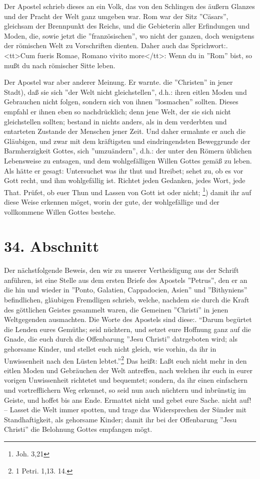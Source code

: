 \medskip

Der Apostel schrieb dieses an ein Volk, das von den Schlingen des äußern Glanzes
und der Pracht der Welt ganz umgeben war. Rom war der Sitz ''Cäsars'', gleichsam
der Brennpunkt des Reichs, und die Gebieterin aller Erfindungen und Moden, die,
sowie jetzt die ''französischen'', wo nicht der ganzen, doch wenigstens der
römischen Welt zu Vorschriften dienten. Daher auch das Sprichwort:. <tt>Cum
fueris Romae, Romano vivito more</tt>: Wenn du in ''Rom'' bist, so mußt du nach
römischer Sitte leben.

\medskip

Der Apostel war aber anderer Meinung. Er warnte. die ''Christen'' in jener
Stadt), daß sie sich ''der Welt nicht gleichstellen'', d.h.: ihren eitlen Moden
und Gebrauchen nicht folgen, sondern sich von ihnen ''losmachen'' sollten.
Dieses empfahl er ihnen eben so nachdrücklich; denn jene Welt, der sie sich
nicht gleichstellen sollten; bestand in nichts anders, als in dem verderbten und
entarteten Zustande der Menschen jener Zeit. Und daher ermahnte er auch die
Gläubigen, und zwar mit dem kräftigsten und eindringendsten Beweggrunde der
Barmherzigkeit Gottes, sich ''umzuändern'', d.h.: der unter den Römern üblichen
Lebensweise zu entsagen, und dem wohlgefälligen Willen Gottes gemäß zu leben.
Als hätte er gesagt: Untersuchet was ihr thut und Itreibet; sehet zu, ob es vor
Gott recht, und ihm wohlgefällig ist. Richtet jeden Gedanken, jedes Wort, jede
That. Prüfet, ob euer Thun und Lassen von Gott ist oder nicht; \footnote{Joh.
3,21}) damit ihr auf diese Weise erkennen möget, worin der gute, der
wohlgefällige und der vollkommene Willen Gottes bestehe.

\section{34. Abschnitt} \label{kap9_ab34}

Der nächstfolgende Beweis, den wir zu unserer Vertheidigung aus der Schrift
anführen, ist eine Stelle aus dem ersten Briefe des Apostels ''Petrus'', den er
an die hin und wieder in ''Ponto, Galatien, Cappadocien, Asien'' und
''Bithyniens'' befindlichen, gläubigen Fremdligen schrieb, welche, nachdem sie
durch die Kraft des göttlichen Geistes gesammelt waren, die Gemeinen ''Christi''
in jenen Weltgegenden ausmachten. Die Worte des Apostels sind diese:. "`Darum
begürtet die Lenden eures Gemüths; seid nüchtern, und setzet eure Hoffnung ganz
auf die Gnade, die euch durch die Offenbarung ''Jesu Christi'' datrgeboten wird;
als gehorsame Kinder, und stellet euch nicht gleich, wie vorhin, da ihr in
Unwissenheit nach den Lüsten lebtet."'\footnote{1 Petri. 1,13. 14.} Das heißt:
Laßt euch nicht mehr in den eitlen Moden und Gebräuchen der Welt antreffen, nach
welchen ihr euch in eurer vorigen Unwissenheit richtetet und bequemtet; sondern,
da ihr einen einfachern und vortrefflichern Weg erkennet, so seid nun auch
nüchtern und inbrünstig im Geiste, und hoffet bis ans Ende. Ermattet nicht und
gebet eure Sache. nicht auf! -- Lasset die Welt immer spotten, und trage das
Widersprechen der Sünder mit Standhaftigkeit, als gehorsame Kinder; damit ihr
bei der Offenbarung ''Jesu Christi'' die Belohnung Gottes empfangen mögt.

